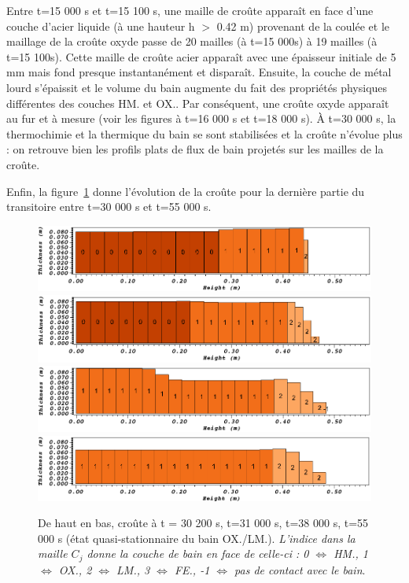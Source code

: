 Entre t=15 000 s et t=15 100 s, une maille de croûte apparaît en face d'une couche d'acier liquide (à une hauteur h $>$ 0.42 m) provenant de la coulée et le maillage de la croûte oxyde passe de 20 mailles (à t=15 000s) à 19 mailles (à t=15 100s). Cette maille de croûte acier apparaît avec une épaisseur initiale de 5 mm mais fond presque instantanément et disparaît. Ensuite, la couche de métal lourd s'épaissit et le volume du bain augmente du fait des propriétés physiques différentes des couches HM. et OX.. Par conséquent, une croûte oxyde apparaît au fur et à mesure (voir les figures à t=16 000 s et t=18 000 s). À t=30 000 s, la thermochimie et la thermique du bain se sont stabilisées et la croûte n'évolue plus : on retrouve bien les profils plats de flux de bain projetés sur les mailles de la croûte.

Enfin, la figure~\ref{fig:croutes_3} donne l'évolution de la croûte pour la dernière partie du transitoire entre t=30 000 s et t=55 000 s.
\begin{figure}
\centering
\includegraphics[width=\textwidth, keepaspectratio=true]{Figures/croute_30200.png}\\
\includegraphics[width=\textwidth, keepaspectratio=true]{Figures/croute_31000.png}\\
\includegraphics[width=\textwidth, keepaspectratio=true]{Figures/croute_38000.png}\\
\includegraphics[width=\textwidth, keepaspectratio=true]{Figures/croute_55000.png}
\caption{De haut en bas, croûte à t = 30 200 s, t=31 000 s, t=38 000 s, t=55 000 s (état quasi-stationnaire du bain OX./LM.). \textit{L'indice dans la maille $C_j$ donne la couche de bain en face de celle-ci : 0 $\Leftrightarrow$ HM., 1 $\Leftrightarrow$ OX., 2 $\Leftrightarrow$ LM., 3 $\Leftrightarrow$ FE., -1 $\Leftrightarrow$ pas de contact avec le bain}.}
\label{fig:croutes_3}
\end{figure}
